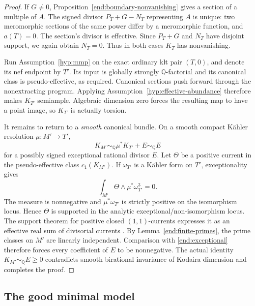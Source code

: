 \documentclass[11pt,letterpaper]{article}
\newcommand{\Q}{\mathbb{Q}}
\theoremstyle{definition}
\theoremstyle{remark}
\begin{document}
\begin{proof}
If \(G\ne0\), Proposition~\ref{end:boundary-nonvanishing}
gives a section of a multiple of \(A\). The signed divisor
\(P_T+G-N_T\) representing \(A\) is unique: two meromorphic
sections of the same power differ by a meromorphic function, and
\(a(T)=0\). The section's divisor is effective. Since \(P_T+G\)
and \(N_T\) have disjoint support, we again obtain \(N_T=0\).
Thus in both cases \(K_T\) has nonvanishing.

Run Assumption~\ref{hyp:mmp} on the exact ordinary klt pair
\((T,0)\), and denote its nef endpoint by \(T'\). Its input
is globally strongly \(\Q\)-factorial and its canonical class
is pseudo-effective, as required. Canonical sections push forward
through the nonextracting program. Applying
Assumption~\ref{hyp:effective-abundance} therefore makes
\(K_{T'}\) semiample. Algebraic dimension zero forces the resulting
map to have a point image, so \(K_{T'}\) is actually torsion.

It remains to return to a \emph{smooth} canonical bundle. On a
smooth compact K\"ahler resolution \(\mu:M'\to T'\),
\begin{equation}\label{end:exceptional}
 K_{M'}\sim_{\Q}\mu^*K_{T'}+E\sim_{\Q}E
\end{equation}
for a possibly signed exceptional rational divisor \(E\). Let
\(\Theta\) be a positive current in the pseudo-effective class
\(c_1(K_{M'})\). If \(\omega_{T'}\) is a K\"ahler form on
\(T'\), exceptionality gives
\[
 \int_{M'}\Theta\wedge\mu^*\omega_{T'}^3=0.
\]
The measure is nonnegative and \(\mu^*\omega_{T'}\) is strictly
positive on the isomorphism locus. Hence \(\Theta\) is supported
in the analytic exceptional/non-isomorphism locus. The support
theorem for positive closed \((1,1)\)-currents expresses it as an
effective real sum of divisorial currents
\cite{DemaillyComplexAnalyticGeometry}. By
Lemma~\ref{end:finite-primes}, the prime classes on \(M'\) are
linearly independent. Comparison with \eqref{end:exceptional}
therefore forces every coefficient of \(E\) to be nonnegative.
The actual identity \(K_{M'}\sim_{\Q}E\ge0\) contradicts
smooth birational invariance of Kodaira dimension and completes
the proof.
\end{proof}

\subsection{The good minimal model}
\end{document}
